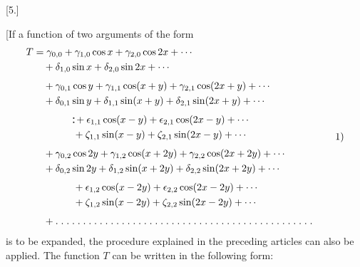 \clearpage
\begin{landscape}
\begingroup
\fontsize{10}{13}\selectfont
{}
\renewcommand{\headrulewidth}{0pt}
\setlength{\lineskip}{4pt}\setlength{\lineskiplimit}{4pt}
\setlength{\arraycolsep}{4pt}
\makeatletter\tagsleft@true\makeatother
\newcommand{\VFivePair}{\mathord{\vcenter{\offinterlineskip\hbox{\rule{.12em}{.12em}}\kern.30em\hbox{\rule{.12em}{.12em}}}}}
\newcommand{\VFivePoint}{\mathord{.}\mkern5mu}
\newcommand{\VFiveTenPoints}{\VFivePoint\VFivePoint\VFivePoint\VFivePoint\VFivePoint\VFivePoint\VFivePoint\VFivePoint\VFivePoint\VFivePoint}
\begin{center}[5.]\end{center}
\par\noindent\hspace*{\parindent}[If a function of two arguments of the form
\[
\begin{aligned}
T&=\gamma_{0,0}+\gamma_{1,0}\cos x+\gamma_{2,0}\cos2x+\cdots\\
 &\quad+\delta_{1,0}\sin x+\delta_{2,0}\sin2x+\cdots\\[4pt]
 &\quad+\gamma_{0,1}\cos y+\gamma_{1,1}\cos(x+y)+\gamma_{2,1}\cos(2x+y)+\cdots\\
 &\quad+\delta_{0,1}\sin y+\delta_{1,1}\sin(x+y)+\delta_{2,1}\sin(2x+y)+\cdots\\[4pt]
 &\qquad\qquad\VFivePair+\epsilon_{1,1}\cos(x-y)+\epsilon_{2,1}\cos(2x-y)+\cdots\\
 &\qquad\qquad+\zeta_{1,1}\sin(x-y)+\zeta_{2,1}\sin(2x-y)+\cdots\\[4pt]
 &\quad+\gamma_{0,2}\cos2y+\gamma_{1,2}\cos(x+2y)+\gamma_{2,2}\cos(2x+2y)+\cdots\\
 &\quad+\delta_{0,2}\sin2y+\delta_{1,2}\sin(x+2y)+\delta_{2,2}\sin(2x+2y)+\cdots\\[4pt]
 &\qquad\qquad+\epsilon_{1,2}\cos(x-2y)+\epsilon_{2,2}\cos(2x-2y)+\cdots\\
 &\qquad\qquad+\zeta_{1,2}\sin(x-2y)+\zeta_{2,2}\sin(2x-2y)+\cdots\\[4pt]
 &\quad+\VFiveTenPoints\VFiveTenPoints\VFiveTenPoints\VFiveTenPoints\VFivePoint\VFivePoint\VFivePoint\VFivePoint\VFivePoint\VFivePoint\VFivePoint
\end{aligned}\tag*{1)}
\]
is to be expanded, the procedure explained in the preceding articles can also be applied. The function \(T\) can be written in the following form:

\end{landscape}
